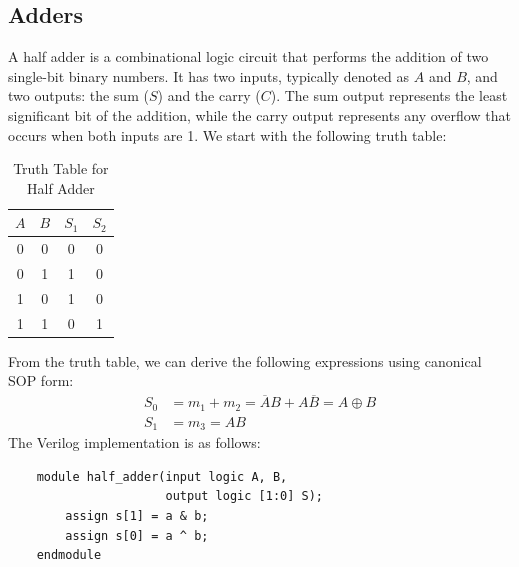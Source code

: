 \documentclass[11pt]{report}
\begin{document}
\subsection{Adders}
\begin{definition}
    A half adder is a combinational logic circuit that performs the addition of two single-bit binary numbers. It has two inputs, typically denoted as $A$ and $B$, and two outputs: the sum ($S$) and the carry ($C$). The sum output represents the least significant bit of the addition, while the carry output represents any overflow that occurs when both inputs are 1. We start with the following truth table:
    \begin{table}[h!]
        \centering
        \begin{tabular}{|c|c|c|c|}
            \hline
            $A$ & $B$ & $S_1$ & $S_2$ \\
            \hline
            0 & 0 & 0 & 0 \\
            0 & 1 & 1 & 0 \\    
            1 & 0 & 1 & 0 \\
            1 & 1 & 0 & 1 \\
            \hline
        \end{tabular}
        \caption{Truth Table for Half Adder}
        \label{tab:half_adder_truth_table}
    \end{table}
    From the truth table, we can derive the following expressions using canonical SOP form:
    \begin{align*}
        S_0 &= m_1 + m_2 = \overline{A}B + A\overline{B} = A \oplus B \\
        S_1 &= m_3 = AB
    \end{align*}
    The Verilog implementation is as follows:
    \begin{verbatim}
    module half_adder(input logic A, B,
                      output logic [1:0] S);
        assign s[1] = a & b;
        assign s[0] = a ^ b;
    endmodule
    \end{verbatim}
\end{definition}
\end{document}
